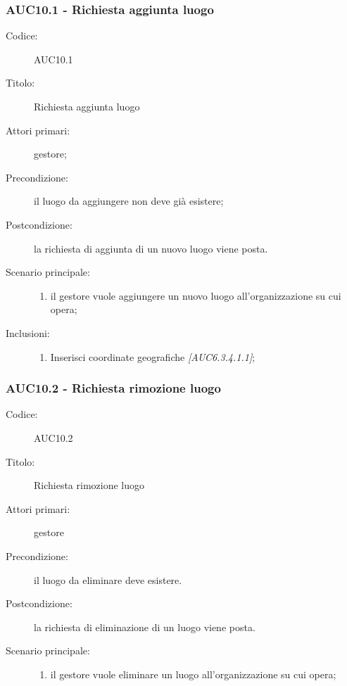 \documentclass[casi-duso]{subfiles}
\begin{document}
\subsubsection{AUC10.1 - Richiesta aggiunta luogo}%
\label{subsub:AUC10.1}
\begin{description}
  \item[Codice:] AUC10.1
  \item[Titolo:] Richiesta aggiunta luogo
  \item[Attori primari:] gestore;
  \item[Precondizione:] il luogo da aggiungere non deve già esistere;
  \item[Postcondizione:] la richiesta di aggiunta di un nuovo luogo viene posta.
  \item[Scenario principale:]
  \begin{enumerate}
    \item il gestore vuole aggiungere un nuovo luogo all'organizzazione su cui opera;
  \end{enumerate}
  \item[Inclusioni:]
  \begin{enumerate}
    \item Inserisci coordinate geografiche \emph{[AUC6.3.4.1.1]};
  \end{enumerate}
\end{description}

\subsubsection{AUC10.2 - Richiesta rimozione luogo}%
\label{subsub:AUC10.2}
\begin{description}
  \item[Codice:] AUC10.2
  \item[Titolo:] Richiesta rimozione luogo
  \item[Attori primari:] gestore
  \item[Precondizione:] il luogo da eliminare deve esistere.
  \item[Postcondizione:] la richiesta di eliminazione di un luogo viene posta.
  \item[Scenario principale:]
  \begin{enumerate}
    \item il gestore vuole eliminare un luogo all'organizzazione su cui opera;
  \end{enumerate}
\end{description}
\end{document}
